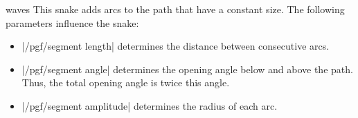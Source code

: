 \begin{decoration}{waves}
  This snake adds arcs to the path that have a constant size. The
  following parameters influence the snake: 
  \begin{itemize}
  \item |/pgf/segment length|
    determines the distance between consecutive arcs.
  \item |/pgf/segment angle|
    determines the opening angle below and above the path. Thus, the
    total opening angle is twice this angle.
  \item |/pgf/segment amplitude|
    determines the radius of each arc.
  \end{itemize}
\begin{codeexample}[]
\end{codeexample}
\end{decoration}


